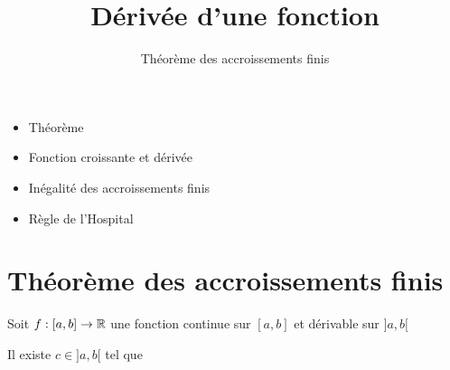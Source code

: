 









\title{{\bf Dérivée d'une fonction}}
\subtitle{Théorème des accroissements finis}

\begin{frame}
  
  \debutmontitre

  \pause

{\footnotesize
\hfill
{}
\begin{minipage}{0.6\textwidth}
  \begin{itemize}
    \item<3-> Théorème
    \item<4-> Fonction croissante et dérivée
    \item<5-> Inégalité des accroissements finis
    \item<6-> Règle de l'Hospital
  \end{itemize}
\end{minipage}
}

\end{frame}

\setcounter{framenumber}{0}




\section*{Théorème des accroissements finis}


\begin{frame}

\begin{theoreme}
Soit $f:[a,b] \to \mathbb{R}$ une fonction continue sur $[a,b]$ et dérivable sur $]a,b[$

Il existe $c\in]a,b[$ tel que 
\end{theoreme}


\pause

\end{frame}


